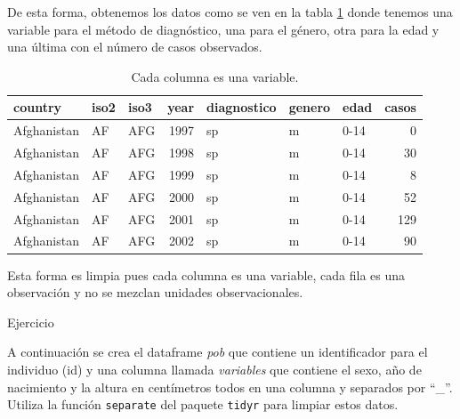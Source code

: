 \documentclass[]{article}
\begin{document}
De esta forma, obtenemos los datos como se ven en la tabla
\ref{tab:varslimpios} donde tenemos una variable para el método de
diagnóstico, una para el género, otra para la edad y una última con el
número de casos observados.

\begin{table}[ht]
\centering
\begingroup\tiny
\begin{tabular}{lllrlllr}
  \hline
country & iso2 & iso3 & year & diagnostico & genero & edad & casos \\ 
  \hline
Afghanistan & AF & AFG & 1997 & sp & m & 0-14 &   0 \\ 
  Afghanistan & AF & AFG & 1998 & sp & m & 0-14 &  30 \\ 
  Afghanistan & AF & AFG & 1999 & sp & m & 0-14 &   8 \\ 
  Afghanistan & AF & AFG & 2000 & sp & m & 0-14 &  52 \\ 
  Afghanistan & AF & AFG & 2001 & sp & m & 0-14 & 129 \\ 
  Afghanistan & AF & AFG & 2002 & sp & m & 0-14 &  90 \\ 
   \hline
\end{tabular}
\endgroup
\caption{Cada columna es una variable.} 
\label{tab:varslimpios}
\end{table}

\begin{nota}[Nota] 
Esta forma es limpia pues cada columna es una variable, cada fila es una observación
y no se mezclan unidades observacionales.
\end{nota}

\renewcommand\bcStyleTitre[1]{\large\textcolor{bbblack}{#1}}

\begin{bclogo}[
  couleur=llred,
  arrondi=0,
  logo=\bcstop,
  barre=none,
  noborder=true]{Ejercicio}
  
A continuación se crea el dataframe \textit{pob} que contiene un identificador
para el individuo (id) y una columna llamada \textit{variables} que contiene
el sexo, año de nacimiento y la altura en centímetros todos en una columna y
separados por ``\_''. \\

Utiliza la función \texttt{separate} del paquete \texttt{tidyr} para limpiar
estos datos.
\end{bclogo}
\end{document}
